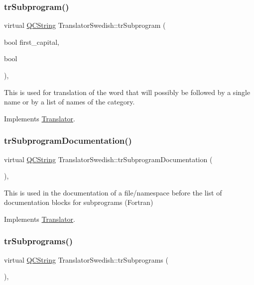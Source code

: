 \subsubsection{\texorpdfstring{trSubprogram()}{trSubprogram()}}
{\footnotesize\ttfamily virtual \mbox{\hyperlink{class_q_c_string}{Q\+C\+String}} Translator\+Swedish\+::tr\+Subprogram (\begin{DoxyParamCaption}\item[{bool}]{first\+\_\+capital,  }\item[{bool}]{ }\end{DoxyParamCaption})\hspace{0.3cm}{\ttfamily [inline]}, {\ttfamily [virtual]}}

This is used for translation of the word that will possibly be followed by a single name or by a list of names of the category. 

Implements \mbox{\hyperlink{class_translator}{Translator}}.

\mbox{\label{class_translator_swedish_afea07fc62f8c9a4d82852df588e508b2}} 
\subsubsection{\texorpdfstring{trSubprogramDocumentation()}{trSubprogramDocumentation()}}
{\footnotesize\ttfamily virtual \mbox{\hyperlink{class_q_c_string}{Q\+C\+String}} Translator\+Swedish\+::tr\+Subprogram\+Documentation (\begin{DoxyParamCaption}{ }\end{DoxyParamCaption})\hspace{0.3cm}{\ttfamily [inline]}, {\ttfamily [virtual]}}

This is used in the documentation of a file/namespace before the list of documentation blocks for subprograms (Fortran) 

Implements \mbox{\hyperlink{class_translator}{Translator}}.

\mbox{\label{class_translator_swedish_a75f714962116de17f0bea3b40ed8ca75}} 
\subsubsection{\texorpdfstring{trSubprograms()}{trSubprograms()}}
{\footnotesize\ttfamily virtual \mbox{\hyperlink{class_q_c_string}{Q\+C\+String}} Translator\+Swedish\+::tr\+Subprograms (\begin{DoxyParamCaption}{ }\end{DoxyParamCaption})\hspace{0.3cm}{\ttfamily [inline]}, {\ttfamily [virtual]}}

